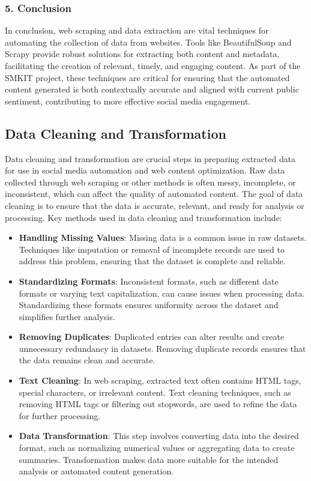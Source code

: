\subsubsection{5. Conclusion}

In conclusion, web scraping and data extraction are vital techniques for automating the collection of data from websites. Tools like BeautifulSoup and Scrapy provide robust solutions for extracting both content and metadata, facilitating the creation of relevant, timely, and engaging content. As part of the SMKIT project, these techniques are critical for ensuring that the automated content generated is both contextually accurate and aligned with current public sentiment, contributing to more effective social media engagement.

\subsection{Data Cleaning and Transformation}
\label{subsec:data_cleaning_and_transformation}

Data cleaning and transformation are crucial steps in preparing extracted data for use in social media automation and web content optimization. Raw data collected through web scraping or other methods is often messy, incomplete, or inconsistent, which can affect the quality of automated content. The goal of data cleaning is to ensure that the data is accurate, relevant, and ready for analysis or processing. Key methods used in data cleaning and transformation include:

\begin{itemize}
    \item \textbf{Handling Missing Values}: Missing data is a common issue in raw datasets. Techniques like imputation or removal of incomplete records are used to address this problem, ensuring that the dataset is complete and reliable.
    \item \textbf{Standardizing Formats}: Inconsistent formats, such as different date formats or varying text capitalization, can cause issues when processing data. Standardizing these formats ensures uniformity across the dataset and simplifies further analysis.
    \item \textbf{Removing Duplicates}: Duplicated entries can alter results and create unnecessary redundancy in datasets. Removing duplicate records ensures that the data remains clean and accurate.
    \item \textbf{Text Cleaning}: In web scraping, extracted text often contains HTML tags, special characters, or irrelevant content. Text cleaning techniques, such as removing HTML tags or filtering out stopwords, are used to refine the data for further processing.
    \item \textbf{Data Transformation}: This step involves converting data into the desired format, such as normalizing numerical values or aggregating data to create summaries. Transformation makes data more suitable for the intended analysis or automated content generation.
\end{itemize}

